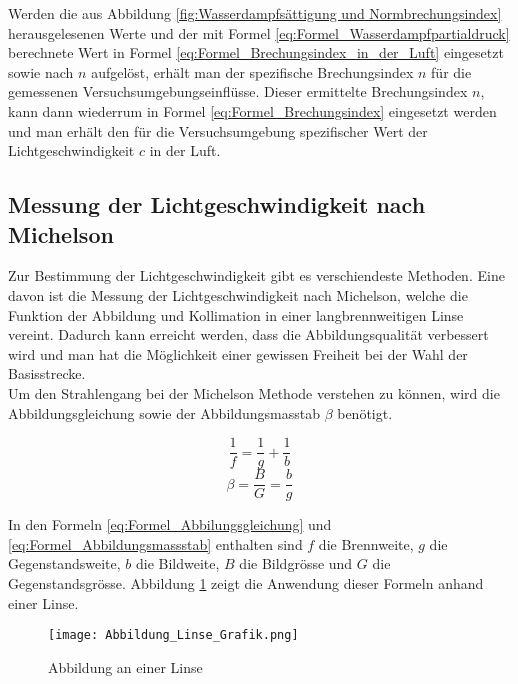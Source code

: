 Werden die aus Abbildung \ref{fig:Wasserdampfsättigung und Normbrechungsindex} herausgelesenen Werte und der mit Formel \ref{eq:Formel_Wasserdampfpartialdruck} berechnete Wert in Formel \ref{eq:Formel_Brechungsindex_in_der_Luft} eingesetzt sowie nach $n$ aufgelöst, erhält man der spezifische Brechungsindex $n$ für die gemessenen Versuchsumgebungseinflüsse. Dieser ermittelte Brechungsindex $n$, kann dann wiederrum in Formel \ref{eq:Formel_Brechungsindex} eingesetzt werden und man erhält den für die Versuchsumgebung spezifischer Wert der Lichtgeschwindigkeit $c$ in der Luft. 

\subsection{Messung der Lichtgeschwindigkeit nach Michelson}

Zur Bestimmung der Lichtgeschwindigkeit gibt es verschiendeste Methoden. Eine davon ist die Messung der Lichtgeschwindigkeit nach Michelson, welche die Funktion der Abbildung und Kollimation in einer langbrennweitigen Linse vereint. Dadurch kann erreicht werden, dass die Abbildungsqualität verbessert wird und man hat die Möglichkeit einer gewissen Freiheit bei der Wahl der Basisstrecke.\\[4mm]
Um den Strahlengang bei der Michelson Methode verstehen zu können, wird die Abbildungsgleichung sowie der Abbildungsmasstab $\beta$ benötigt.

\begin{equation}
\dfrac{1}{f} = \dfrac{1}{g} + \dfrac{1}{b}
\label{eq:Formel_Abbilungsgleichung}
\end{equation}
\begin{equation}
\beta = \frac{B}{G} = \frac{b}{g}
\label{eq:Formel_Abbildungsmassstab}
\end{equation}

In den Formeln \ref{eq:Formel_Abbilungsgleichung} und \ref{eq:Formel_Abbildungsmassstab} enthalten sind $f$ die Brennweite, $g$ die Gegenstandsweite, $b$ die Bildweite, $B$ die Bildgrösse und $G$ die Gegenstandsgrösse. Abbildung \ref{fig:Abbildung an einer Linse} zeigt die Anwendung dieser Formeln anhand einer Linse.

\begin{figure}[htb]
\texttt{[image: Abbildung\_Linse\_Grafik.png]}
\caption{Abbildung an einer Linse}
\label{fig:Abbildung an einer Linse}
\end{figure}


